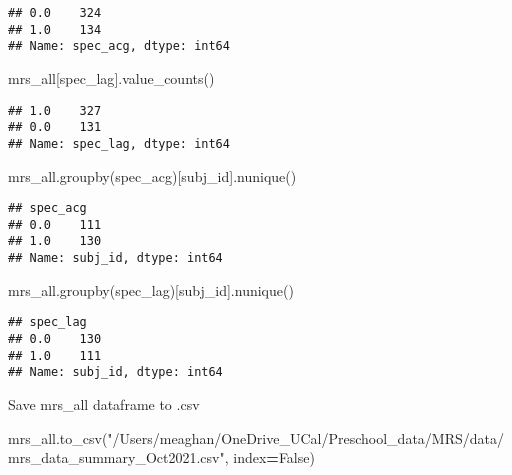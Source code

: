 \documentclass[
]{article}
\newenvironment{Shaded}{\begin{snugshade}}{\end{snugshade}}
\newcommand{\NormalTok}[1]{#1}
\newcommand{\OperatorTok}[1]{\textcolor[rgb]{0.81,0.36,0.00}{\textbf{#1}}}
\newcommand{\StringTok}[1]{\textcolor[rgb]{0.31,0.60,0.02}{#1}}
\newcommand{\VariableTok}[1]{\textcolor[rgb]{0.00,0.00,0.00}{#1}}
\begin{document}
\begin{verbatim}
## 0.0    324
## 1.0    134
## Name: spec_acg, dtype: int64
\end{verbatim}

\begin{Shaded}
\begin{Highlighting}[]
\NormalTok{mrs\_all[}\StringTok{\textquotesingle{}spec\_lag\textquotesingle{}}\NormalTok{].value\_counts()}
\end{Highlighting}
\end{Shaded}

\begin{verbatim}
## 1.0    327
## 0.0    131
## Name: spec_lag, dtype: int64
\end{verbatim}

\begin{Shaded}
\begin{Highlighting}[]
\NormalTok{mrs\_all.groupby(}\StringTok{\textquotesingle{}spec\_acg\textquotesingle{}}\NormalTok{)[}\StringTok{\textquotesingle{}subj\_id\textquotesingle{}}\NormalTok{].nunique()}
\end{Highlighting}
\end{Shaded}

\begin{verbatim}
## spec_acg
## 0.0    111
## 1.0    130
## Name: subj_id, dtype: int64
\end{verbatim}

\begin{Shaded}
\begin{Highlighting}[]
\NormalTok{mrs\_all.groupby(}\StringTok{\textquotesingle{}spec\_lag\textquotesingle{}}\NormalTok{)[}\StringTok{\textquotesingle{}subj\_id\textquotesingle{}}\NormalTok{].nunique()}
\end{Highlighting}
\end{Shaded}

\begin{verbatim}
## spec_lag
## 0.0    130
## 1.0    111
## Name: subj_id, dtype: int64
\end{verbatim}

Save mrs\_all dataframe to .csv

\begin{Shaded}
\begin{Highlighting}[]
\NormalTok{mrs\_all.to\_csv(}\StringTok{"/Users/meaghan/OneDrive\_UCal/Preschool\_data/MRS/data/mrs\_data\_summary\_Oct2021.csv"}\NormalTok{, index}\OperatorTok{=}\VariableTok{False}\NormalTok{)}
\end{Highlighting}
\end{Shaded}
\end{document}
